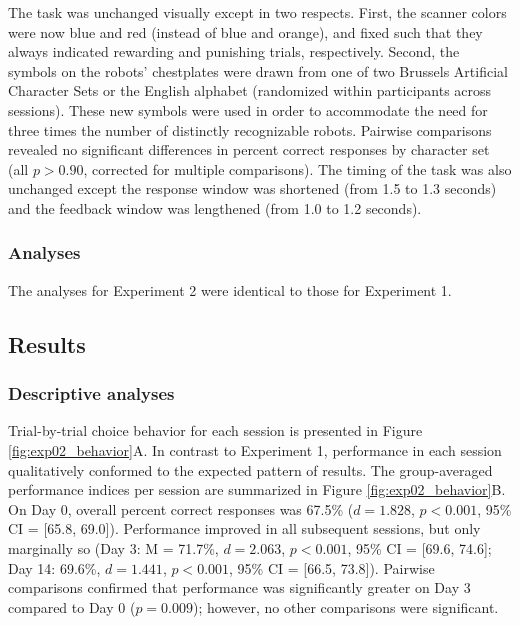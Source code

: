 \documentclass[a4paper,12pt]{article}
\begin{document}
\begin{refsection}[main]
The task was unchanged visually except in two respects. First, the scanner colors were now blue and red (instead of blue and orange), and fixed such that they always indicated rewarding and punishing trials, respectively. Second, the symbols on the robots' chestplates were drawn from one of two Brussels Artificial Character Sets \cite{vidal2017bacs} or the English alphabet (randomized within participants across sessions). These new symbols were used in order to accommodate the need for three times the number of distinctly recognizable robots. Pairwise comparisons revealed no significant differences in percent correct responses by character set (all $p > 0.90$, corrected for multiple comparisons). The timing of the task was also unchanged except the response window was shortened (from 1.5 to 1.3 seconds) and the feedback window was lengthened (from 1.0 to 1.2 seconds). 

\subsubsection*{Analyses}

The analyses for Experiment 2 were identical to those for Experiment 1. 

\subsection*{Results}

\subsubsection*{Descriptive analyses}

Trial-by-trial choice behavior for each session is presented in Figure \ref{fig:exp02_behavior}A. In contrast to Experiment 1, performance in each session qualitatively conformed to the expected pattern of results. The group-averaged performance indices per session are summarized in Figure \ref{fig:exp02_behavior}B. On Day 0, overall percent correct responses was 67.5\% ($d = 1.828$, $p < 0.001$, 95\% CI = [65.8, 69.0]). Performance improved in all subsequent sessions, but only marginally so (Day 3: M = 71.7\%, $d = 2.063$, $p < 0.001$, 95\% CI = [69.6, 74.6]; Day 14: 69.6\%, $d = 1.441$, $p < 0.001$, 95\% CI = [66.5, 73.8]). Pairwise comparisons confirmed that performance was significantly greater on Day 3 compared to Day 0 ($p = 0.009$); however, no other comparisons were significant.


\end{refsection}
\end{document}
